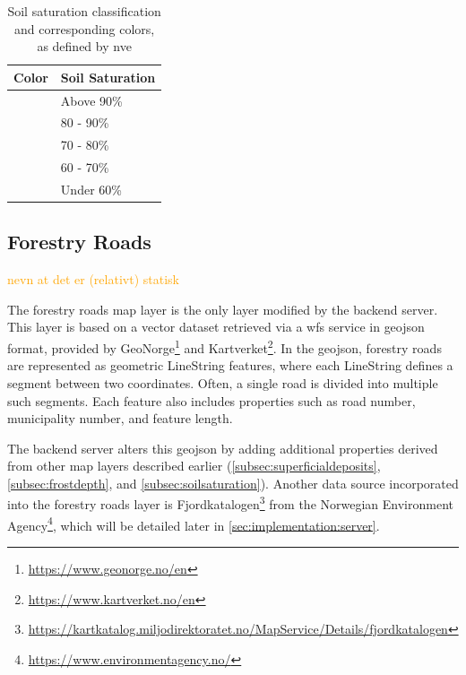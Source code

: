 \begin{table}[h]
    \centering
    \begin{tabular}{|l|l|}
        \hline  
        \textbf{Color} & \textbf{Soil Saturation} \\
        \hline
        \cellcolor[HTML]{f82200} & Above 90\% \\
        \hline
        \cellcolor[HTML]{f8c400} & 80 - 90\% \\
        \hline
        \cellcolor[HTML]{f8fc00} & 70 - 80\% \\
        \hline
        \cellcolor[HTML]{29d460} & 60 - 70\% \\
        \hline
        \cellcolor[HTML]{e4e4e4} & Under 60\% \\
        \hline
    \end{tabular}
    \caption[Soil saturation classification and corresponding colors]{Soil saturation classification and corresponding colors, as defined by \acrshort{nve} \cite{nve2025waterdata}}
    \label{tab:soil_saturation_classification}
\end{table}

\subsection{Forestry Roads}

\textcolor{orange}{nevn at det er (relativt) statisk} 

The forestry roads map layer is the only layer modified by the backend server. This layer is based on a vector dataset retrieved via a \gls{wfs} service in \gls{geojson} format, provided by GeoNorge\footnote{\url{https://www.geonorge.no/en}} and Kartverket\footnote{\url{https://www.kartverket.no/en}}. In the \gls{geojson}, forestry roads are represented as geometric LineString features, where each LineString defines a segment between two coordinates. Often, a single road is divided into multiple such segments. Each feature also includes properties such as road number, municipality number, and feature length.

The backend server alters this \gls{geojson} by adding additional properties derived from other map layers described earlier (\ref{subsec:superficialdeposits}, \ref{subsec:frostdepth}, and \ref{subsec:soilsaturation}). Another data source incorporated into the forestry roads layer is Fjordkatalogen\footnote{\url{https://kartkatalog.miljodirektoratet.no/MapService/Details/fjordkatalogen}} from the Norwegian Environment Agency\footnote{\url{https://www.environmentagency.no/}}, which will be detailed later in \autoref{sec:implementation:server}. 

